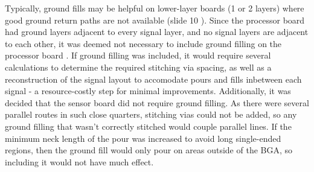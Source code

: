 Typically, ground fills may be helpful on lower-layer boards (1 or 2 layers) where good ground return paths are not available (slide 10 \cite{Kay2022Crosstalk}).
Since the processor board had ground layers adjacent to every signal layer, and no signal layers are adjacent to each other, it was deemed not necessary to include ground filling on the processor board \cite{Kay2022Crosstalk}. If ground filling was included, it would require several calculations to determine the required stitching via spacing, as well as a reconstruction of the signal layout to accomodate pours and fills inbetween each signal - a resource-costly step for minimal improvements.
\nl
Additionally, it was decided that the sensor board did not require ground filling. As there were several parallel routes in such close quarters, stitching vias could not be added, so any ground filling that wasn't correctly stitched would couple parallel lines. If the minimum neck length of the pour was increased to avoid long single-ended regions, then the ground fill would only pour on areas outside of the BGA, so including it would not have much effect.